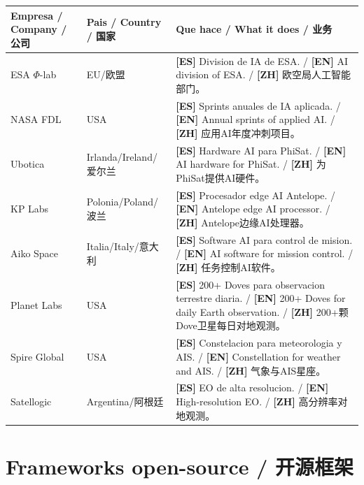 \documentclass[11pt,a4paper]{report}
\begin{document}
\begin{center}
\small
\begin{longtable}{p{3.5cm}p{2cm}p{8.5cm}}
\toprule
\textbf{Empresa / Company / 公司} &
\textbf{Pais / Country / 国家} &
\textbf{Que hace / What it does / 业务} \\
\midrule
\endhead
ESA $\Phi$-lab &
EU/欧盟 &
\textbf{[ES]} Division de IA de ESA. / \textbf{[EN]} AI division of ESA. / \textbf{[ZH]} 欧空局人工智能部门。 \\
NASA FDL &
USA &
\textbf{[ES]} Sprints anuales de IA aplicada. / \textbf{[EN]} Annual sprints of applied AI. / \textbf{[ZH]} 应用AI年度冲刺项目。 \\
Ubotica &
Irlanda/Ireland/爱尔兰 &
\textbf{[ES]} Hardware AI para PhiSat. / \textbf{[EN]} AI hardware for PhiSat. / \textbf{[ZH]} 为PhiSat提供AI硬件。 \\
KP Labs &
Polonia/Poland/波兰 &
\textbf{[ES]} Procesador edge AI Antelope. / \textbf{[EN]} Antelope edge AI processor. / \textbf{[ZH]} Antelope边缘AI处理器。 \\
Aiko Space &
Italia/Italy/意大利 &
\textbf{[ES]} Software AI para control de mision. / \textbf{[EN]} AI software for mission control. / \textbf{[ZH]} 任务控制AI软件。 \\
Planet Labs &
USA &
\textbf{[ES]} 200+ Doves para observacion terrestre diaria. / \textbf{[EN]} 200+ Doves for daily Earth observation. / \textbf{[ZH]} 200+颗Dove卫星每日对地观测。 \\
Spire Global &
USA &
\textbf{[ES]} Constelacion para meteorologia y AIS. / \textbf{[EN]} Constellation for weather and AIS. / \textbf{[ZH]} 气象与AIS星座。 \\
Satellogic &
Argentina/阿根廷 &
\textbf{[ES]} EO de alta resolucion. / \textbf{[EN]} High-resolution EO. / \textbf{[ZH]} 高分辨率对地观测。 \\
\bottomrule
\end{longtable}
\end{center}

\chapter{Frameworks open-source / 开源框架}
\end{document}
